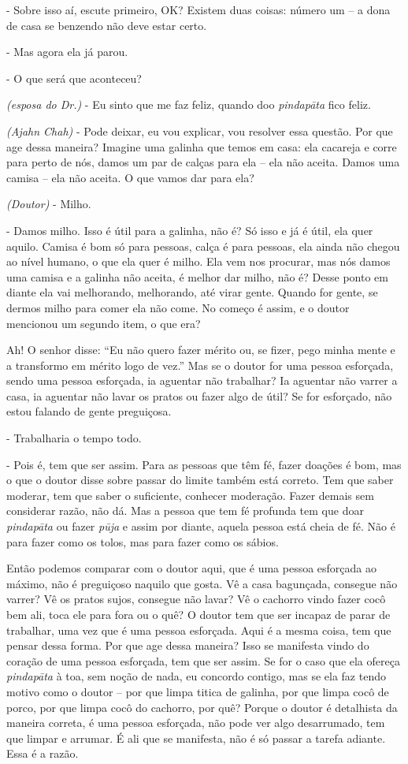 {}- Sobre isso aí, escute primeiro, OK? Existem duas coisas: número
um – a dona de casa se benzendo não deve estar certo.

{}- Mas agora ela já parou.

{}- O que será que aconteceu?

\textit{(esposa do Dr.)} - Eu sinto que me faz feliz, quando doo
\textit{pindap\=ata} fico feliz.

\textit{(Ajahn Chah)} - Pode deixar, eu vou explicar, vou resolver
essa questão. Por que age dessa maneira? Imagine uma galinha que temos
em casa: ela cacareja e corre para perto de nós, damos um par de calças
para ela – ela não aceita. Damos uma camisa – ela não aceita. O que
vamos dar para ela? 

\textit{(Doutor)} - Milho.

{}- Damos milho. Isso é útil para a galinha, não é? Só isso e já é
útil, ela quer aquilo. Camisa é bom só para pessoas, calça é para
pessoas, ela ainda não chegou ao nível humano, o que ela quer é milho.
Ela vem nos procurar, mas nós damos uma camisa e a galinha não aceita,
é melhor dar milho, não é? Desse ponto em diante ela vai melhorando,
melhorando, até virar gente. Quando for gente, se dermos milho para
comer ela não come. No começo é assim, e o doutor mencionou um segundo
item, o que era?

Ah! O senhor disse: “Eu não quero fazer mérito ou, se fizer, pego
minha mente e a transformo em mérito logo de vez.” Mas se o doutor for
uma pessoa esforçada, sendo uma pessoa esforçada, ia aguentar não
trabalhar? Ia aguentar não varrer a casa, ia aguentar não lavar os
pratos ou fazer algo de útil? Se for esforçado, não estou falando de
gente preguiçosa. 

{}- Trabalharia o tempo todo.

{}- Pois é, tem que ser assim. Para as pessoas que têm fé, fazer
doações é bom, mas o que o doutor disse sobre passar do limite também
está correto. Tem que saber moderar, tem que saber o suficiente,
conhecer moderação. Fazer demais sem considerar razão, não dá. Mas a
pessoa que tem fé profunda tem que doar \textit{pindap\=ata }ou fazer
\textit{p\=uja }e assim por diante, aquela pessoa está cheia de fé. Não
é para fazer como os tolos, mas para fazer como os sábios. 

Então podemos comparar com o doutor aqui, que é uma pessoa esforçada
ao máximo, não é preguiçoso naquilo que gosta. Vê a casa bagunçada,
consegue não varrer? Vê os pratos sujos, consegue não lavar? Vê o
cachorro vindo fazer cocô bem ali, toca ele para fora ou o quê? O
doutor tem que ser incapaz de parar de trabalhar, uma vez que é uma
pessoa esforçada. Aqui é a mesma coisa, tem que pensar dessa forma. Por
que age dessa maneira? Isso se manifesta vindo do coração de uma pessoa
esforçada, tem que ser assim. Se for o caso que ela ofereça
\textit{pindap\=ata} à toa, sem noção de nada, eu concordo contigo, mas
se ela faz tendo motivo como o doutor – por que limpa titica de
galinha, por que limpa cocô de porco, por que limpa cocô do cachorro,
por quê? Porque o doutor é detalhista da maneira correta, é uma pessoa
esforçada, não pode ver algo desarrumado, tem que limpar e arrumar. É
ali que se manifesta, não é só passar a tarefa adiante. Essa é a razão.


